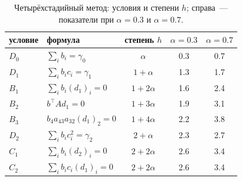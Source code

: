 \documentclass[11pt,a4paper]{article}
\theoremstyle{plain}
\theoremstyle{definition}
\begin{document}
\begin{table}[ht]
\centering\small
\caption{Четырёхстадийный метод: условия и степени $h$; справа~--- показатели при $\alpha=0.3$ и $\alpha=0.7$.}\label{tab:s4cond}
\begin{tabular}{llccc}
\toprule
условие & формула & степень $h$ & $\alpha=0.3$ & $\alpha=0.7$\\
\midrule
$D_0$ & $\sum_ib_i=\gamma_0$ & $\alpha$ & 0.3 & 0.7\\
$D_1$ & $\sum_ib_ic_i=\gamma_1$ & $1+\alpha$ & 1.3 & 1.7\\
$B_1$ & $\sum_ib_i(d_1)_i=0$ & $1+2\alpha$ & 1.6 & 2.4\\
$B_2$ & $b^{\top}Ad_1=0$ & $1+3\alpha$ & 1.9 & 3.1\\
$B_3$ & $b_4a_{43}a_{32}(d_1)_2=0$ & $1+4\alpha$ & 2.2 & 3.8\\
$D_2$ & $\sum_ib_ic_i^2=\gamma_2$ & $2+\alpha$ & 2.3 & 2.7\\
$C_1$ & $\sum_ib_i(d_2)_i=0$ & $2+2\alpha$ & 2.6 & 3.4\\
$C_2$ & $\sum_ib_ic_i(d_1)_i=0$ & $2+2\alpha$ & 2.6 & 3.4\\
\bottomrule
\end{tabular}
\end{table}
\end{document}
